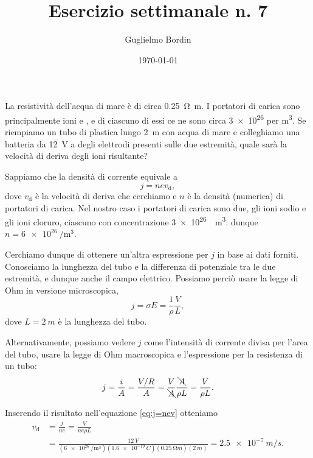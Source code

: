 \documentclass[10pt]{gulartcl}
\title{Esercizio settimanale n. 7}
\author{Guglielmo Bordin}
\date{\today}
\begin{document}
\maketitle 

\noindent
La resistività dell’acqua di mare è di circa \qty{0.25}{\ohm m}. I
portatori di carica sono principalmente ioni  e , e di
ciascuno di essi ce ne sono circa \num{3e26} per \unit{m\cubed}. Se
riempiamo un tubo di plastica lungo \qty{2}{m} con acqua di mare e
colleghiamo una batteria da \qty{12}{V} a degli elettrodi presenti sulle
due estremità, quale sarà la velocità di deriva degli ioni risultante?

\begin{solution}
Sappiamo che la densità di corrente equivale a
\begin{equation}
    j = n e v_\mathrm{d},
    \label{eq:j=nev}
\end{equation}
dove $v_{\mathrm{d}}$ è la velocità di deriva che cerchiamo e $n$ è la
densità (numerica) di portatori di carica. Nel nostro caso i portatori di
carica sono due, gli ioni sodio e gli ioni cloruro, ciascuno con
concentrazione \qty{3e26}{\per\meter\cubed}: dunque $n =
\qty{6e26}{\per\meter\cubed}$.

Cerchiamo dunque di ottenere un’altra espressione per $j$ in base ai dati
forniti. Conosciamo la lunghezza del tubo e la differenza di potenziale tra
le due estremità, e dunque anche il campo elettrico. Possiamo perciò usare
la legge di Ohm in versione microscopica,
\begin{equation}
    j = \sigma E = \frac{1}{\rho} \frac{V}{L},
\end{equation}
dove $L = \qty{2}{m}$ è la lunghezza del tubo.

Alternativamente, possiamo vedere $j$ come l’intensità di corrente divisa
per l’area del tubo, usare la legge di Ohm macroscopica e l’espressione per
la resistenza di un tubo:
\begin{equation}
    j = \frac{i}{A} = \frac{V / R}{A}
      = \frac{V}{\bcancel{A}} \frac{\bcancel{A}}{\rho L}
      = \frac{V}{\rho L}.
\end{equation}

Inserendo il risultato nell’equazione \eqref{eq:j=nev} otteniamo
\begin{equation}
\begin{split}
    v_{\mathrm{d}} &= \frac{j}{n e} = \frac{V}{n e \rho L} \\
    &= \frac{\qty{12}{V}}{(\qty{6e26}{\per\meter\cubed}) (\qty{1.6e-19}{C})
    (\qty{0.25}{\ohm m}) (\qty{2}{m})} = \qty{2.5e-7}{m\per s}.
\end{split}
\end{equation}
\end{solution}
\end{document}
